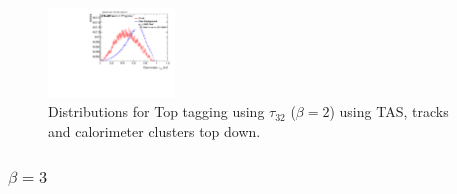 \begin{figure}[H]
\includegraphics[width=0.3\textwidth]{sascha_input/Appendix/Distributions/top/distributions/beta2/h_recoJet_nSub32_2_bin6.pdf}
\caption{\footnotesize{Distributions for Top tagging using $\tau_{32}$ ($\beta=2$) using TAS, tracks and calorimeter clusters top down.}}
\end{figure}

\subsubsection*{$\beta=3$}
